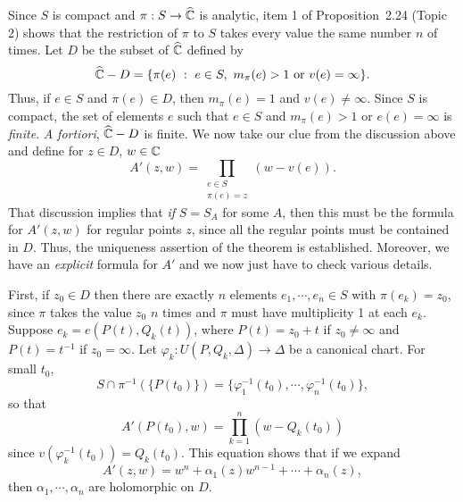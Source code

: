 \documentclass[a4paper,11pt]{article}
\begin{document}
\begin{myproof}
  Since $S$ is compact and $\pi : S \to \widehat{{\mathbb C}}$ is analytic,
  item 1 of Proposition~2.24 (Topic 2) shows that the restriction of $\pi$
  to $S$ takes every value the same number $n$ of times.  Let $D$ be
  the subset of $\widehat{{\mathbb C}}$ defined by
  $$
  \widehat{{\mathbb C}} - D
  = \{\pi(e) ~:~ e\in S,\ m_\pi(e) > 1\text{ or }v(e) = \infty\}.
  $$
  Thus, if $e \in S$ and $\pi(e) \in D$, then $m_\pi(e) = 1$ and $v(e)
  \ne \infty$.  Since $S$ is compact, the set of elements $e$ such
  that $e \in S$ and $m_\pi(e) > 1$ or $e(e) = \infty$ is
  \emph{finite}.  \emph{A fortiori}, $\widehat{{\mathbb C}} - D$ is finite.
  We now take our clue from the discussion above and define for 
  $z \in D$, $w \in {\mathbb C}$
  $$
  A'(z,w) = \prod_{\substack{e\in S\\\pi(e) = z}} (w-v(e)).
  $$
  That discussion implies that \emph{if} $S = S_A$ for some $A$, then
  this must be the formula for $A'(z,w)$ for regular points $z$, since
  all the regular points must be contained in $D$.  Thus, the
  uniqueness assertion of the theorem is established.  Moreover, we
  have an \emph{explicit} formula for $A'$ and we now just have to
  check various details.

  First, if $z_0 \in D$ then there are exactly $n$ elements $e_1,
  \cdots, e_n \in S$ with $\pi(e_k) = z_0$, since $\pi$ takes the
  value $z_0$ $n$ times and $\pi$ must have multiplicity 1 at each
  $e_k$.  Suppose $e_k = e(P(t), Q_k(t))$, where $P(t) = z_0 + t$ if
  $z_0 \ne \infty$ and $P(t) = t^{-1}$ if $z_0 = \infty$.  Let
  $\varphi_k : U(P,Q_k,\Delta) \to \Delta$ be a canonical chart.  For
  small $t_0$,
  $$
  S \cap \pi^{-1}(\{P(t_0)\}) = \{\varphi_1^{-1}(t_0), \cdots, 
  \varphi_n^{-1}(t_0)\},
  $$
  so that
  $$
  A'(P(t_0), w) = \prod_{k=1}^n (w - Q_k(t_0))
  $$
  since $v(\varphi_k^{-1}(t_0)) = Q_k(t_0)$.  This equation shows that
  if we expand
  $$
  A'(z,w) = w^n + \alpha_1(z) w^{n-1} + \cdots + \alpha_n(z),
  $$
  then $\alpha_1, \cdots, \alpha_n$ are holomorphic on $D$.


\end{myproof}
\end{document}
